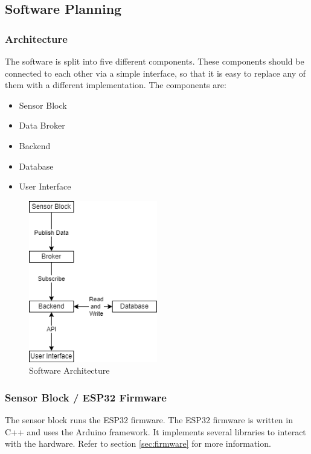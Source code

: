 \newpage
\subsection{Software Planning}

\subsubsection{Architecture}
The software is split into five different components. These components should be connected to each other via a simple interface, so that it is easy to replace any of them with a different implementation.
The components are:
\begin{itemize}
    \item Sensor Block
    \item Data Broker
    \item Backend
    \item Database
    \item User Interface
\end{itemize}

\begin{figure}
    \centering
    \includegraphics[width=0.5\textwidth]{figures/hivetracker_software_architecture.png}
    \caption{Software Architecture}
    \label{fig:software_architecture}
\end{figure}

\subsubsection{Sensor Block / ESP32 Firmware}
The sensor block runs the ESP32 firmware. The ESP32 firmware is written in C++ and uses the Arduino framework. It implements several libraries to interact with the hardware. Refer to section \ref{sec:firmware} for more information.

